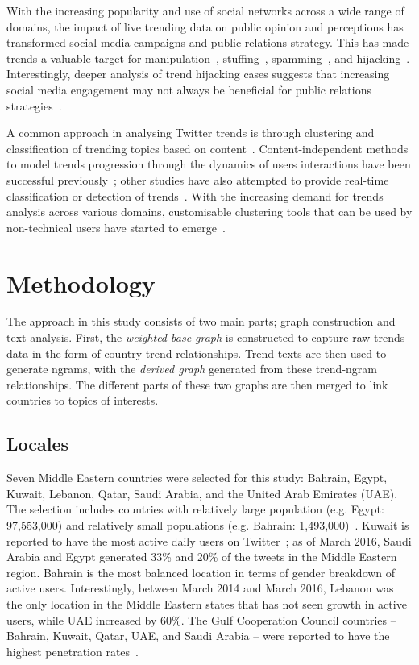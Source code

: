 \documentclass[conference]{IEEEtran}
\begin{document}
With the increasing popularity and use of social networks across a
wide range of domains, the impact of live trending data on public
opinion and perceptions has transformed social media campaigns and
public relations strategy. This has made trends a valuable target for
manipulation~\cite{Zhang2017}, stuffing~\cite{Irani2010},
spamming~\cite{Sedhai2015,Chu2012}, and
hijacking~\cite{VanDam2016}. Interestingly, deeper analysis of trend
hijacking cases suggests that increasing social media engagement may
not always be beneficial for public relations
strategies~\cite{Sanderson2016,albishry-et-al:ssei2018}.

A common approach in analysing Twitter trends is through clustering
and classification of trending topics based on
content~\cite{Zubiaga2011,Benhardus2013,Ferragina2015,albishry-et-al:iccci2017}. Content-independent
methods to model trends progression through the dynamics of users
interactions have been successful previously~\cite{TenThij2016}; other
studies have also attempted to provide real-time classification or
detection of trends~\cite{Mathioudakis2010,Zubiaga2015}. With the
increasing demand for trends analysis across various domains,
customisable clustering tools that can be used by non-technical users
have started to emerge~\cite{Arn2018}.

\section{Methodology}\label{method}

The approach in this study consists of two main parts; graph
construction and text analysis. First, the {\emph{weighted base
graph}} is constructed to capture raw trends data in the form of
country-trend relationships. Trend texts are then used to generate
ngrams, with the {\emph{derived graph}} generated from these
trend-ngram relationships. The different parts of these two graphs are
then merged to link countries to topics of interests.

\subsection{Locales}

Seven Middle Eastern countries were selected for this study: Bahrain,
Egypt, Kuwait, Lebanon, Qatar, Saudi Arabia, and the United Arab
Emirates (UAE). The selection includes countries with relatively large
population (e.g. Egypt: 97,553,000) and relatively small populations
(e.g. Bahrain:
1,493,000)~\cite{UnitedNationsDepartmentofEconomicandSocialAffairs2017}.
Kuwait is reported to have the most active daily users on
Twitter~\cite{Salem2017}; as of March 2016, Saudi Arabia and Egypt
generated 33\% and 20\% of the tweets in the Middle Eastern
region. Bahrain is the most balanced location in terms of gender
breakdown of active users. Interestingly, between March 2014 and March
2016, Lebanon was the only location in the Middle Eastern states that
has not seen growth in active users, while UAE increased by 60\%. The
Gulf Cooperation Council countries -- Bahrain, Kuwait, Qatar, UAE, and
Saudi Arabia -- were reported to have the highest penetration
rates~\cite{Salem2017}.
\end{document}
